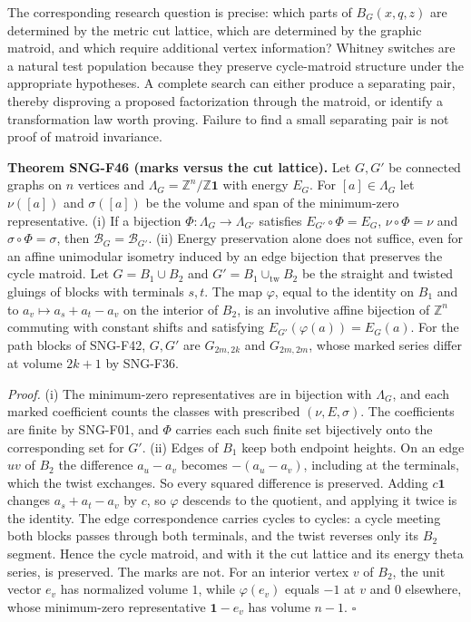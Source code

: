 \documentclass[
  11pt,
  a4paper,
]{report}
\begin{document}
The corresponding research question is precise: which parts of
\(B_G(x,q,z)\) are determined by the metric cut lattice, which are
determined by the graphic matroid, and which require additional vertex
information? Whitney switches are a natural test population because they
preserve cycle-matroid structure under the appropriate hypotheses. A
complete search can either produce a separating pair, thereby disproving
a proposed factorization through the matroid, or identify a
transformation law worth proving. Failure to find a small separating
pair is not proof of matroid invariance.

\textbf{Theorem SNG-F46 (marks versus the cut lattice).} Let \(G,G'\) be
connected graphs on \(n\) vertices and
\(\Lambda_G=\mathbb Z^n/\mathbb Z\mathbf1\) with energy \(E_G\). For
\([a]\in\Lambda_G\) let \(\nu([a])\) and \(\sigma([a])\) be the volume
and span of the minimum-zero representative. (i) If a bijection
\(\Phi:\Lambda_G\to\Lambda_{G'}\) satisfies \(E_{G'}\circ\Phi=E_G\),
\(\nu\circ\Phi=\nu\) and \(\sigma\circ\Phi=\sigma\), then
\(\mathcal B_G=\mathcal B_{G'}\). (ii) Energy preservation alone does
not suffice, even for an affine unimodular isometry induced by an edge
bijection that preserves the cycle matroid. Let \(G=B_1\cup B_2\) and
\(G'=B_1\cup_{\mathrm{tw}}B_2\) be the straight and twisted gluings of
blocks with terminals \(s,t\). The map \(\varphi\), equal to the
identity on \(B_1\) and to \(a_v\mapsto a_s+a_t-a_v\) on the interior of
\(B_2\), is an involutive affine bijection of \(\mathbb Z^n\) commuting
with constant shifts and satisfying \(E_{G'}(\varphi(a))=E_G(a)\). For
the path blocks of SNG-F42, \(G,G'\) are \(G_{2m,2k}\) and
\(G_{2m,2m}\), whose marked series differ at volume \(2k+1\) by SNG-F36.

\emph{Proof.} (i) The minimum-zero representatives are in bijection with
\(\Lambda_G\), and each marked coefficient counts the classes with
prescribed \((\nu,E,\sigma)\). The coefficients are finite by SNG-F01,
and \(\Phi\) carries each such finite set bijectively onto the
corresponding set for \(G'\). (ii) Edges of \(B_1\) keep both endpoint
heights. On an edge \(uv\) of \(B_2\) the difference \(a_u-a_v\) becomes
\(-(a_u-a_v)\), including at the terminals, which the twist exchanges.
So every squared difference is preserved. Adding \(c\mathbf1\) changes
\(a_s+a_t-a_v\) by \(c\), so \(\varphi\) descends to the quotient, and
applying it twice is the identity. The edge correspondence carries
cycles to cycles: a cycle meeting both blocks passes through both
terminals, and the twist reverses only its \(B_2\) segment. Hence the
cycle matroid, and with it the cut lattice and its energy theta series,
is preserved. The marks are not. For an interior vertex \(v\) of
\(B_2\), the unit vector \(e_v\) has normalized volume \(1\), while
\(\varphi(e_v)\) equals \(-1\) at \(v\) and \(0\) elsewhere, whose
minimum-zero representative \(\mathbf1-e_v\) has volume \(n-1\).
\(\square\)
\end{document}
